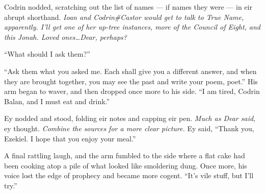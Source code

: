 Codrin nodded, scratching out the list of names — if names they were — in eir abrupt shorthand. \emph{Ioan and Codrin\#Castor would get to talk to True Name, apparently. I'll get one of her up-tree instances, more of the Council of Eight, and this Jonah. Loved ones\ldots Dear, perhaps?}

``What should I ask them?''

``Ask them what you asked me. Each shall give you a different answer, and when they are brought together, you may see the past and write your poem, poet.'' His arm began to waver, and then dropped once more to his side. ``I am tired, Codrin Balan, and I must eat and drink.''

Ey nodded and stood, folding eir notes and capping eir pen. \emph{Much as Dear said,} ey thought. \emph{Combine the sources for a more clear picture.} Ey said, ``Thank you, Ezekiel. I hope that you enjoy your meal.''

A final rattling laugh, and the arm fumbled to the side where a flat cake had been cooking atop a pile of what looked like smoldering dung. Once more, his voice lost the edge of prophecy and became more cogent. ``It's vile stuff, but I'll try.''
